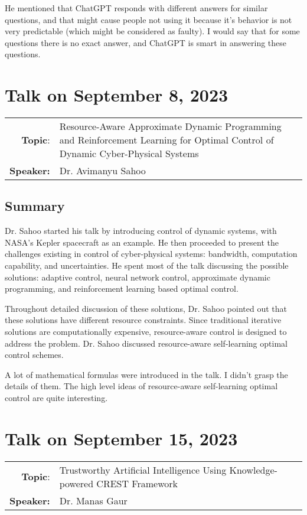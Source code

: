 \documentclass[11pt, oneside]{article}   	%
\begin{document}
He mentioned that ChatGPT responds with different answers for similar questions, and that might cause people not using it because it's behavior is not very predictable (which might be considered as faulty). I would say that for some questions there is no exact answer, and ChatGPT is smart in answering these questions.

\newpage
\section{Talk on September 8, 2023}
\begin{tabularx} {\textwidth}{r X}
\textbf{Topic}: & Resource-Aware Approximate Dynamic Programming and Reinforcement Learning for Optimal Control of Dynamic Cyber-Physical Systems \\
\textbf{Speaker:} & Dr. Avimanyu Sahoo\\
\end{tabularx}

\subsection{Summary}
Dr. Sahoo started his talk by introducing control of dynamic systems, with NASA's Kepler spacecraft as an example. He then proceeded to present the challenges existing in control of cyber-physical systems: bandwidth, computation capability, and uncertainties. He spent most of the talk discussing the possible solutions: adaptive control, neural network control, approximate dynamic programming, and reinforcement learning based optimal control.

Throughout detailed discussion of these solutions, Dr. Sahoo pointed out that these solutions have different resource constraints. Since traditional iterative solutions are computationally expensive, resource-aware control is designed to address the problem. Dr. Sahoo discussed resource-aware self-learning optimal control schemes. 

A lot of mathematical formulas were introduced in the talk. I didn't grasp the details of them. The high level ideas of resource-aware self-learning optimal control are quite interesting. 


\newpage
\section{Talk on September 15, 2023}
\begin{tabularx} {\textwidth}{r X}
\textbf{Topic}: & Trustworthy Artificial Intelligence Using Knowledge-powered CREST Framework \\
\textbf{Speaker:} & Dr. Manas Gaur\\
\end{tabularx}
\end{document}
